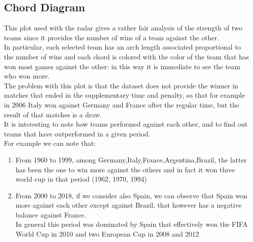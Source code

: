 \documentclass[journal]{vgtc}                %
\begin{document}
\subsection{Chord Diagram}
This plot used with the radar gives a rather fair analysis of the strength of two teams since it provides the number of wins of a team against the other.\\In particular, each selected team has an arch length associated proportional to the number of wins and each chord is colored with the color of the team that has won most games against the other: in this way it is immediate to see the team who won more.\\The problem with this plot is that the dataset does not provide the winner in matches that ended in the supplementary time and penalty, so that for example in 2006 Italy won against Germany and France after the regular time, but the result of that  matches is a draw. \\It is interesting to note how teams performed against each other, and to find out teams that have outperformed in a given period.\\For example we can note that:
\begin{enumerate}
\item From 1960 to 1999, among Germany,Italy,France,Argentina,Brazil, the latter has been the one to win more against the others and in fact it won three world cup in that period (1962, 1970, 1994)
\item From 2000 to 2018, if we consider also Spain, we can observe that Spain won more against each other except against Brazil, that however has a negative balance against France.\\In general this period was dominated by Spain that effectively won the FIFA World Cup in 2010 and two European Cup in 2008 and 2012
\end{enumerate}
\end{document}
